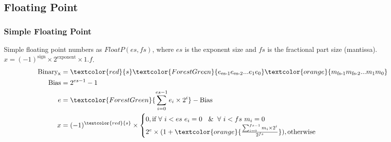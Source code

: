\subsection{Floating Point}
\begin{frame}
    \frametitle{Simple Floating Point}
    Simple floating point numbers as $FloatP(es, fs)$, where $es$ is the exponent size and $fs$ is the fractional part size (mantissa).
    $x=(-1)^{\text{sign}} \times 2^{\text{exponent}}  \times 1.f$.
    \begin{equation}
        \begin{aligned}
            \text{Binary}\textsubscript{x}&=\textcolor{red}{s}\textcolor{ForestGreen}{e\textsubscript{es-1}e\textsubscript{es-2}...e\textsubscript{1}e\textsubscript{0}}\textcolor{orange}{m\textsubscript{fs-1}m\textsubscript{fs-2}...m\textsubscript{1}m\textsubscript{0}}\\
            \text{Bias}&=2^{es-1}-1\\
            e&=\textcolor{ForestGreen}{\sum_{i=0}^{es-1} e_i \times 2^{i}} - \text{Bias}\\
            x&=(-1)^{\textcolor{red}{s}} \times \begin{cases}
                    0, \text{if } \forall\ i<es\ e_i=0\ \And \forall\ i<fs\ m_i=0 \\
                    2^e \times (1 + \textcolor{orange}{\frac{\sum_{i=0}^{fs-1} m_i \times 2^i}{2^{fs}}}), \text{otherwise}
            \end{cases}
        \end{aligned}
    \end{equation}
\end{frame}



